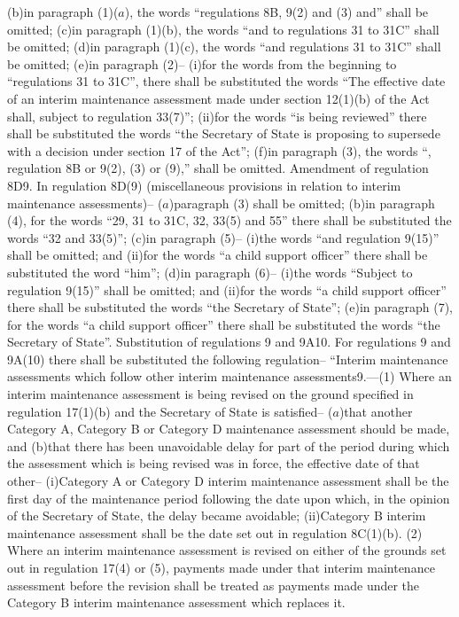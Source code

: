 \documentclass[12pt,a4paper]{article}
\begin{document}
(b)in paragraph (1)($a$), the words “regulations 8B, 9(2) and (3) and” shall be omitted;
(c)in paragraph (1)(b), the words “and to regulations 31 to 31C” shall be omitted;
(d)in paragraph (1)(c), the words “and regulations 31 to 31C” shall be omitted;
(e)in paragraph (2)–
(i)for the words from the beginning to “regulations 31 to 31C”, there shall be substituted the words “The effective date of an interim maintenance assessment made under section 12(1)(b) of the Act shall, subject to regulation 33(7)”;
(ii)for the words “is being reviewed” there shall be substituted the words “the Secretary of State is proposing to supersede with a decision under section 17 of the Act”;
(f)in paragraph (3), the words “, regulation 8B or 9(2), (3) or (9),” shall be omitted.
Amendment of regulation 8D9.  In regulation 8D(9) (miscellaneous provisions in relation to interim maintenance assessments)–
($a$)paragraph (3) shall be omitted;
(b)in paragraph (4), for the words “29, 31 to 31C, 32, 33(5) and 55” there shall be substituted the words “32 and 33(5)”;
(c)in paragraph (5)–
(i)the words “and regulation 9(15)” shall be omitted; and
(ii)for the words “a child support officer” there shall be substituted the word “him”;
(d)in paragraph (6)–
(i)the words “Subject to regulation 9(15)” shall be omitted; and
(ii)for the words “a child support officer” there shall be substituted the words “the Secretary of State”;
(e)in paragraph (7), for the words “a child support officer” there shall be substituted the words “the Secretary of State”.
Substitution of regulations 9 and 9A10.  For regulations 9 and 9A(10) there shall be substituted the following regulation–
“Interim maintenance assessments which follow other interim maintenance assessments9.—(1) Where an interim maintenance assessment is being revised on the ground specified in regulation 17(1)(b) and the Secretary of State is satisfied–
($a$)that another Category A, Category B or Category D maintenance assessment should be made, and
(b)that there has been unavoidable delay for part of the period during which the assessment which is being revised was in force,
the effective date of that other–
(i)Category A or Category D interim maintenance assessment shall be the first day of the maintenance period following the date upon which, in the opinion of the Secretary of State, the delay became avoidable;
(ii)Category B interim maintenance assessment shall be the date set out in regulation 8C(1)(b).
(2) Where an interim maintenance assessment is revised on either of the grounds set out in regulation 17(4) or (5), payments made under that interim maintenance assessment before the revision shall be treated as payments made under the Category B interim maintenance assessment which replaces it.
\end{document}
